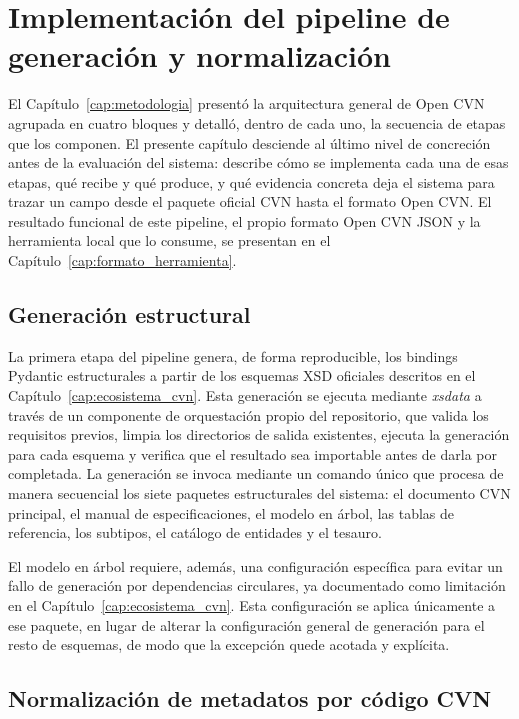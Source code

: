 \chapter{Implementación del pipeline de generación y normalización}
\label{cap:pipeline}

El Capítulo~\ref{cap:metodologia} presentó la arquitectura general de Open CVN
agrupada en cuatro bloques y detalló, dentro de cada uno, la secuencia de
etapas que los componen. El presente capítulo desciende al último nivel de
concreción antes de la evaluación del sistema: describe cómo se implementa
cada una de esas etapas, qué recibe y qué produce, y qué evidencia concreta
deja el sistema para trazar un campo desde el paquete oficial CVN hasta el
formato Open CVN. El resultado funcional de este pipeline, el propio formato
Open CVN JSON y la herramienta local que lo consume, se presentan en el
Capítulo~\ref{cap:formato_herramienta}.

\section{Generación estructural}
\label{sec:pipeline_generacion_estructural}

La primera etapa del pipeline genera, de forma reproducible, los bindings
Pydantic estructurales a partir de los esquemas XSD oficiales descritos en el
Capítulo~\ref{cap:ecosistema_cvn}. Esta generación se ejecuta mediante
\textit{xsdata} a través de un componente de orquestación propio del
repositorio, que valida los requisitos previos, limpia los directorios de
salida existentes, ejecuta la generación para cada esquema y verifica que el
resultado sea importable antes de darla por completada. La generación se
invoca mediante un comando único que procesa de manera secuencial los siete
paquetes estructurales del sistema: el documento CVN principal, el manual de
especificaciones, el modelo en árbol, las tablas de referencia, los subtipos,
el catálogo de entidades y el tesauro.

El modelo en árbol requiere, además, una configuración específica para evitar
un fallo de generación por dependencias circulares, ya documentado como
limitación en el Capítulo~\ref{cap:ecosistema_cvn}. Esta configuración se
aplica únicamente a ese paquete, en lugar de alterar la configuración general
de generación para el resto de esquemas, de modo que la excepción quede
acotada y explícita.

\section{Normalización de metadatos por código CVN}
\label{sec:pipeline_normalizacion}


